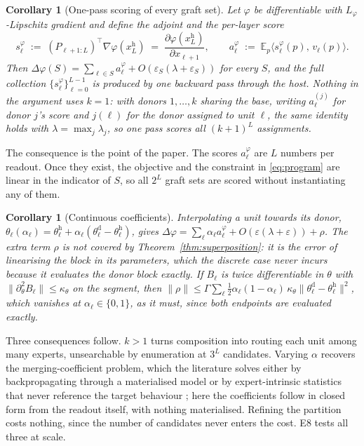 \documentclass[10pt]{article}
\theoremstyle{plain}
\newtheorem{corollary}[theorem]{Corollary}
\theoremstyle{definition}
\theoremstyle{remark}
\newcommand{\host}{\mathrm{h}}
\newcommand{\donor}{\mathrm{d}}
\newcommand{\Ex}{\mathbb{E}}
\begin{document}
\begin{corollary}[One-pass scoring of every graft set]
\label{cor:scoring}
Let $\varphi$ be differentiable with $L_\varphi$-Lipschitz gradient and define
the adjoint and the per-layer score
\begin{equation}
s^{\varphi}_\ell \;:=\; \left(P_{\ell+1:L}\right)^{\!\top}\nabla\varphi\!\left(x^{\host}_L\right) \;=\; \frac{\partial \varphi\!\left(x^{\host}_L\right)}{\partial x_{\ell+1}},
\qquad
a^{\varphi}_\ell \;:=\; \Ex_p\big\langle s^{\varphi}_\ell(p),\, v_\ell(p)\big\rangle .
\end{equation}
Then $\Delta\varphi(S) = \sum_{\ell\in S} a^{\varphi}_\ell + O\!\left(\varepsilon_S(\lambda+\varepsilon_S)\right)$
for every $S$, and the full collection $\{s^{\varphi}_\ell\}_{\ell=0}^{L-1}$ is
produced by one backward pass through the host. Nothing in the argument uses
$k=1$: with donors $1,\dots,k$ sharing the base, writing $a^{(j)}_\ell$ for donor
$j$'s score and $j(\ell)$ for the donor assigned to unit $\ell$, the same identity
holds with $\lambda=\max_j\lambda_j$, so one pass scores all $(k{+}1)^{L}$
assignments.
\end{corollary}

The consequence is the point of the paper. The scores $a^{\varphi}_\ell$ are
$L$ numbers per readout. Once they exist, the objective and the constraint in
\eqref{eq:program} are linear in the indicator of $S$, so all $2^L$ graft sets
are scored without instantiating any of them.

\begin{corollary}[Continuous coefficients]
\label{cor:alpha}
Interpolating a unit towards its donor, $\theta_\ell(\alpha_\ell)=\theta^{\host}_\ell+\alpha_\ell(\theta^{\donor}_\ell-\theta^{\host}_\ell)$,
gives $\Delta\varphi = \sum_\ell \alpha_\ell a^{\varphi}_\ell + O(\varepsilon(\lambda+\varepsilon)) + \rho$.
The extra term $\rho$ is \emph{not} covered by
Theorem~\ref{thm:superposition}: it is the error of linearising the block in its
\emph{parameters}, which the discrete case never incurs because it evaluates the
donor block exactly. If $B_\ell$ is twice differentiable in $\theta$ with
$\|\partial^2_\theta B_\ell\|\le\kappa_\theta$ on the segment, then
$\|\rho\| \le \Gamma\sum_\ell \tfrac{1}{2}\alpha_\ell(1-\alpha_\ell)\,\kappa_\theta\|\theta^{\donor}_\ell-\theta^{\host}_\ell\|^2$,
which vanishes at $\alpha_\ell\in\{0,1\}$, as it must, since both endpoints are
evaluated exactly.
\end{corollary}

Three consequences follow. $k>1$ turns composition into routing each unit among
many experts, unsearchable by enumeration at $3^L$ candidates. Varying $\alpha$
recovers the merging-coefficient problem, which the literature solves either by
backpropagating through a materialised model \citep{yang2024adamerging,
supermerge2024} or by expert-intrinsic statistics that never reference the target
behaviour \citep{acm2025, shin2026safetyswap}; here the coefficients follow in
closed form from the readout itself, with nothing materialised. Refining the
partition costs nothing, since the number of candidates never enters the cost.
E8 tests all three at scale.
\end{document}

